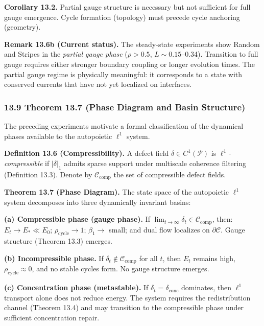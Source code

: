 \documentclass[
]{article}
\begin{document}
\textbf{Corollary 13.2.} Partial gauge structure is necessary but not
sufficient for full gauge emergence. Cycle formation (topology) must
precede cycle anchoring (geometry).

\textbf{Remark 13.6b (Current status).} The steady-state experiments
show Random and Stripes in the \emph{partial gauge phase}
(\(\rho > 0.5\), \(L \sim 0.15\)--0.34). Transition to full gauge
requires either stronger boundary coupling or longer evolution times.
The partial gauge regime is physically meaningful: it corresponds to a
state with conserved currents that have not yet localized on interfaces.

\subsubsection{13.9 Theorem 13.7 (Phase Diagram and Basin
Structure)}\label{theorem-13.7-phase-diagram-and-basin-structure}

The preceding experiments motivate a formal classification of the
dynamical phases available to the autopoietic \(\ell^1\) system.

\textbf{Definition 13.6 (Compressibility).} A defect field
\(\delta \in C^1(\mathcal{P})\) is \emph{\(\ell^1\)-compressible} if
\(|\delta|_1\) admits sparse support under multiscale coherence
filtering (Definition 13.3). Denote by \(\mathcal{C}_{\mathrm{comp}}\)
the set of compressible defect fields.

\textbf{Theorem 13.7 (Phase Diagram).} The state space of the
autopoietic \(\ell^1\) system decomposes into three dynamically
invariant basins:

\textbf{(a) Compressible phase (gauge phase).} If
\(\lim_{t \to \infty} \delta_t \in \mathcal{C}_{\mathrm{comp}}\), then:
\(E_t \to E_* \ll E_0\); \(\rho_{\mathrm{cycle}} \to 1\);
\(\beta_1 \to\) small; and dual flow localizes on
\(\partial\mathcal{C}\). Gauge structure (Theorem 13.3) emerges.

\textbf{(b) Incompressible phase.} If
\(\delta_t \notin \mathcal{C}_{\mathrm{comp}}\) for all \(t\), then
\(E_t\) remains high, \(\rho_{\mathrm{cycle}} \approx 0\), and no stable
cycles form. No gauge structure emerges.

\textbf{(c) Concentration phase (metastable).} If
\(\delta_t = \delta_{\mathrm{conc}}\) dominates, then \(\ell^1\)
transport alone does not reduce energy. The system requires the
redistribution channel (Theorem 13.4) and may transition to the
compressible phase under sufficient concentration repair.
\end{document}
